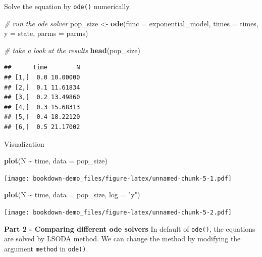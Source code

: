 \documentclass[
]{book}
\newenvironment{Shaded}{\begin{snugshade}}{\end{snugshade}}
\newcommand{\AttributeTok}[1]{\textcolor[rgb]{0.13,0.29,0.53}{#1}}
\newcommand{\CommentTok}[1]{\textcolor[rgb]{0.56,0.35,0.01}{\textit{#1}}}
\newcommand{\FunctionTok}[1]{\textcolor[rgb]{0.13,0.29,0.53}{\textbf{#1}}}
\newcommand{\NormalTok}[1]{#1}
\newcommand{\OtherTok}[1]{\textcolor[rgb]{0.56,0.35,0.01}{#1}}
\newcommand{\SpecialCharTok}[1]{\textcolor[rgb]{0.81,0.36,0.00}{\textbf{#1}}}
\newcommand{\StringTok}[1]{\textcolor[rgb]{0.31,0.60,0.02}{#1}}
\begin{document}
Solve the equation by \texttt{ode()} numerically.

\begin{Shaded}
\begin{Highlighting}[]
\CommentTok{\# run the ode solver}
\NormalTok{pop\_size }\OtherTok{\textless{}{-}} \FunctionTok{ode}\NormalTok{(}\AttributeTok{func =}\NormalTok{ exponential\_model, }\AttributeTok{times =}\NormalTok{ times, }\AttributeTok{y =}\NormalTok{ state, }\AttributeTok{parms =}\NormalTok{ parms)}

\CommentTok{\# take a look at the results}
\FunctionTok{head}\NormalTok{(pop\_size)}
\end{Highlighting}
\end{Shaded}

\begin{verbatim}
##      time        N
## [1,]  0.0 10.00000
## [2,]  0.1 11.61834
## [3,]  0.2 13.49860
## [4,]  0.3 15.68313
## [5,]  0.4 18.22120
## [6,]  0.5 21.17002
\end{verbatim}

Visualization

\begin{Shaded}
\begin{Highlighting}[]
\FunctionTok{plot}\NormalTok{(N }\SpecialCharTok{\textasciitilde{}}\NormalTok{ time, }\AttributeTok{data =}\NormalTok{ pop\_size)}
\end{Highlighting}
\end{Shaded}

\texttt{[image: bookdown-demo\_files/figure-latex/unnamed-chunk-5-1.pdf]}

\begin{Shaded}
\begin{Highlighting}[]
\FunctionTok{plot}\NormalTok{(N }\SpecialCharTok{\textasciitilde{}}\NormalTok{ time, }\AttributeTok{data =}\NormalTok{ pop\_size, }\AttributeTok{log =} \StringTok{"y"}\NormalTok{)}
\end{Highlighting}
\end{Shaded}

\texttt{[image: bookdown-demo\_files/figure-latex/unnamed-chunk-5-2.pdf]}

\textbf{Part 2 - Comparing different ode solvers}
In default of \texttt{ode()}, the equations are solved by LSODA method. We can change the method by modifying the argument \texttt{method} in \texttt{ode()}.
\end{document}
